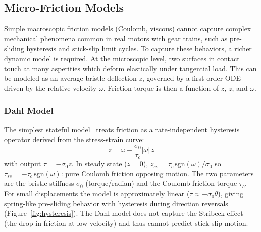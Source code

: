 \documentclass[10pt, a4paper, twocolumn]{article}
\begin{document}
\subsection{Micro-Friction Models}
\label{sec:micro_friction}

Simple macroscopic friction models (Coulomb, viscous) cannot capture complex mechanical phenomena common in real motors with gear trains, such as pre-sliding hysteresis and stick-slip limit cycles. To capture these behaviors, a richer dynamic model is required. At the microscopic level, two surfaces in contact touch at many asperities which deform elastically under tangential load. This can be modeled as an average bristle deflection $z$, governed by a first-order ODE driven by the relative velocity $\omega$. Friction torque is then a function of $z$, $\dot{z}$, and $\omega$.

\subsubsection{Dahl Model}
\label{sec:dahl}

The simplest stateful model~\cite{dahl68} treats friction as a rate-independent hysteresis operator derived from the stress-strain curve:
\begin{equation*}
  \dot{z} = \omega - \frac{\sigma_0}{\tau_c} |\omega| \, z
  \label{eq:dahl_state}
\end{equation*}
with output $\tau = -\sigma_0 z$. In steady state ($\dot{z}=0$), $z_{ss} = \tau_c \, \text{sgn}(\omega) / \sigma_0$ so $\tau_{ss} = -\tau_c \, \text{sgn}(\omega)$: pure Coulomb friction opposing motion. The two parameters are the bristle stiffness $\sigma_0$ (torque/radian) and the Coulomb friction torque $\tau_c$.
For small displacements the model is approximately linear ($\tau \approx -\sigma_0 \theta$), giving spring-like pre-sliding behavior with hysteresis during direction reversals (Figure~\ref{fig:hysteresis}). The Dahl model does not capture the Stribeck effect~\cite{stribeck1902} (the drop in friction at low velocity) and thus cannot predict stick-slip motion.
\end{document}
